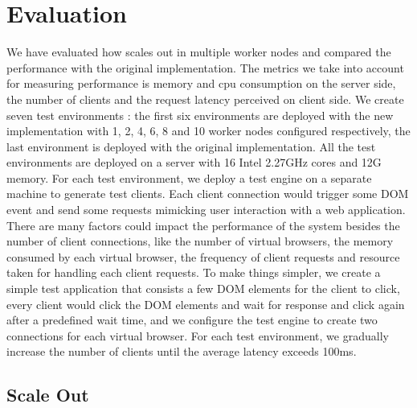 \section{Evaluation}
\label{sec:eval}
We have evaluated how \cb{} scales out in multiple worker nodes and compared the performance
with the original implementation.
The metrics we take into account for measuring performance is memory and cpu consumption on the server side, 
the number of clients
and the request latency perceived on client side.
We create seven test environments : 
the first six environments are deployed with the new implementation with 1, 2, 4, 6, 8 and 10 worker nodes 
configured respectively, 
the last environment is deployed with the original implementation.
All the test environments are deployed on a server with 16 Intel 2.27GHz cores and 12G memory.
For each test environment, 
we deploy a test engine on a separate machine to generate test clients.
Each client connection would trigger some DOM event and send some requests mimicking user interaction with a web application.
There are many factors could impact the performance of the system besides the number of client connections,
like the number of virtual browsers, the memory consumed by each virtual browser, 
the frequency of client requests
and resource taken for handling each client requests.
To make things simpler, we create a simple test application that consists a few DOM elements for the client to click,
every client would click the DOM elements and wait for response and click again after a predefined wait time,
and we configure the test engine to create two connections for each virtual browser.
For each test environment, 
we gradually increase the number of clients until the average latency exceeds 100ms.



\subsection{Scale Out}


\subsection{}
